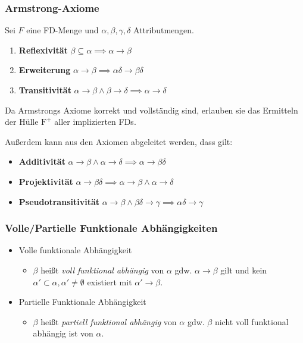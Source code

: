             \subsubsection{Armstrong-Axiome} %
            	Sei \( F \) eine FD-Menge und \( \alpha, \beta, \gamma, \delta \) Attributmengen.
                \begin{enumerate}
                	\item \textbf{Reflexivität} \( \beta \subseteq \alpha \implies \alpha \rightarrow \beta \)
                	\item \textbf{Erweiterung} \( \alpha \rightarrow \beta \implies \alpha\delta \rightarrow \beta\delta \)
                	\item \textbf{Transitivität} \( \alpha \rightarrow \beta \land \beta \rightarrow \delta \implies \alpha \rightarrow \delta \)
                \end{enumerate}
            	Da Armstrongs Axiome korrekt und vollständig sind, erlauben sie das Ermitteln der Hülle \(\text{F}^+\) aller implizierten FDs.
            	
            	Außerdem kann aus den Axiomen abgeleitet werden, dass gilt:
            	\begin{itemize}
            		\item \textbf{Additivität} \( \alpha \rightarrow \beta \land \alpha \rightarrow \delta \implies \alpha \rightarrow \beta\delta \)
            		\item \textbf{Projektivität} \( \alpha \rightarrow \beta\delta \implies \alpha \rightarrow \beta \land \alpha \rightarrow \delta \)
            		\item \textbf{Pseudotransitivität} \( \alpha \rightarrow \beta \land \beta\delta \rightarrow \gamma \implies \alpha\delta \rightarrow \gamma \)
            	\end{itemize}

            \subsubsection{Volle/Partielle Funktionale Abhängigkeiten} %
                \begin{itemize}
                	\item Volle funktionale Abhängigkeit
                		\begin{itemize}
                			\item \(\beta\) heißt \textit{voll funktional abhängig} von \(\alpha\) gdw. \(\alpha \rightarrow \beta\) gilt und kein \( \alpha' \subset \alpha, \alpha' \neq \emptyset \) existiert mit \( \alpha' \rightarrow \beta \).
                		\end{itemize}
                	\item Partielle Funktionale Abhängigkeit
                		\begin{itemize}
                			\item \( \beta \) heißt \textit{partiell funktional abhängig} von \(\alpha\) gdw. \(\beta\) nicht voll funktional abhängig ist von \(\alpha\).
                		\end{itemize}
                \end{itemize}
            

